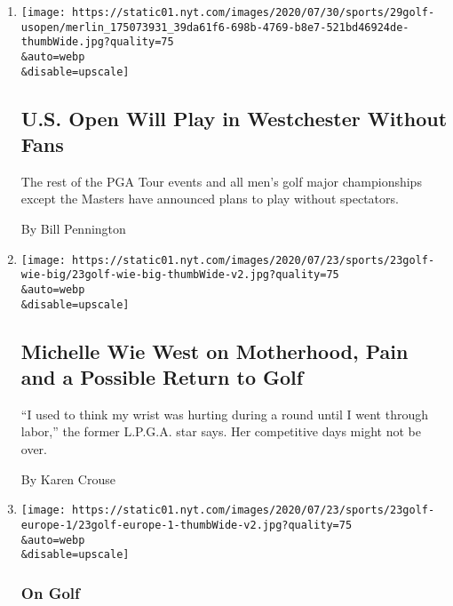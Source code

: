 \begin{enumerate}
\def\labelenumi{\arabic{enumi}.}
\item
  \href{/2020/07/29/sports/golf/us-open-westchester-without-fans.html}{}

  \texttt{[image: https://static01.nyt.com/images/2020/07/30/sports/29golf-usopen/merlin\_175073931\_39da61f6-698b-4769-b8e7-521bd46924de-thumbWide.jpg?quality=75\\\&auto=webp\\\&disable=upscale]}

  \hypertarget{us-open-will-play-in-westchester-without-fans}{%
  \subsection{U.S. Open Will Play in Westchester Without
  Fans}\label{us-open-will-play-in-westchester-without-fans}}

  The rest of the PGA Tour events and all men's golf major championships
  except the Masters have announced plans to play without spectators.

  By Bill Pennington
\item
  \href{/2020/07/24/sports/golf/michelle-wie-golf.html}{}

  \texttt{[image: https://static01.nyt.com/images/2020/07/23/sports/23golf-wie-big/23golf-wie-big-thumbWide-v2.jpg?quality=75\\\&auto=webp\\\&disable=upscale]}

  \hypertarget{michelle-wie-west-on-motherhood-pain-and-a-possible-return-to-golf}{%
  \subsection{Michelle Wie West on Motherhood, Pain and a Possible
  Return to
  Golf}\label{michelle-wie-west-on-motherhood-pain-and-a-possible-return-to-golf}}

  ``I used to think my wrist was hurting during a round until I went
  through labor,'' the former L.P.G.A. star says. Her competitive days
  might not be over.

  By Karen Crouse
\item
  \href{/2020/07/23/sports/golf/british-masters-newcastle-wylam.html}{}

  \texttt{[image: https://static01.nyt.com/images/2020/07/23/sports/23golf-europe-1/23golf-europe-1-thumbWide-v2.jpg?quality=75\\\&auto=webp\\\&disable=upscale]}

  \hypertarget{on-golf}{%
  \subsubsection{On Golf}\label{on-golf}}


\end{enumerate}
